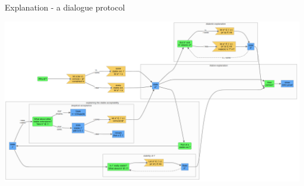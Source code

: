 \documentclass[aspectratio=169]{beamer}
\begin{document}
\begin{frame}[label={sec:orgbc50a89}]{Explanation - a dialogue protocol}
\begin{center}
\includegraphics[width=.9\linewidth]{./images/DAC-explanation.png}
\end{center}
\end{frame}
\end{document}
